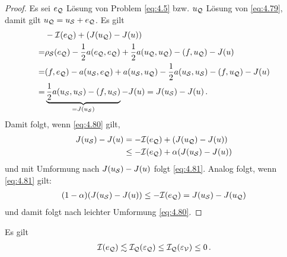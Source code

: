 \begin{proof}
Es sei $e_{\mathcal Q}$ Lösung von Problem \eqref{eq:4.5} bzw. $u_{\mathcal Q}$ Lösung von \eqref{eq:4.79}, damit gilt $u_{\mathcal Q} = u_{\mathcal S} + e_{\mathcal Q}$. Es gilt
\begin{align*}
	& -\mathcal I(e_{\mathcal Q}) + (J(u_{\mathcal Q})-J(u))  \\
	 = & \rho_{\mathcal S}(e_{\mathcal Q})-\frac 12 a(e_{\mathcal Q},e_{\mathcal Q}) + \frac 12 a(u_{\mathcal Q},u_{\mathcal Q})-(f,u_{\mathcal Q})-J(u) \\
	 = & (f,e_{\mathcal Q})-a(u_{\mathcal S},e_{\mathcal Q})+a(u_{\mathcal S},u_{\mathcal Q})-\frac 12 a(u_{\mathcal S},u_{\mathcal S})-(f,u_{\mathcal Q})- J(u) \\
	 = & \underbrace{\frac 1 2 a(u_{\mathcal S},u_{\mathcal S}) - (f,u_{\mathcal S})}_{=J(u_{\mathcal S})} - J(u) = J(u_{\mathcal S})-J(u) \, .
\end{align*}
Damit folgt, wenn \eqref{eq:4.80} gilt,
\begin{align*}
	J(u_{\mathcal S})-J(u) &= -\mathcal I (e_{\mathcal Q}) + (J(u_{\mathcal Q})-J(u)) \\
	& \le -\mathcal I(e_{\mathcal Q}) + \alpha (J(u_{\mathcal S})-J(u))
\end{align*}
und mit Umformung nach $J(u_{\mathcal S})-J(u)$ folgt \eqref{eq:4.81}. Analog folgt, wenn \eqref{eq:4.81} gilt:
\begin{align*}
	(1-\alpha)(J(u_{\mathcal S}) - J(u)) \le -\mathcal I (e_{\mathcal Q}) = J(u_{\mathcal S})-J(u_{\mathcal Q}) 
\end{align*}
und damit folgt nach leichter Umformung \eqref{eq:4.80}.
\end{proof}


\begin{lemma}\label{lem:4.27}
Es gilt
\begin{align}\label{eq:4.82}
	\mathcal I(e_{\mathcal Q}) \lesssim \mathcal I_{\mathcal Q} (\varepsilon_{\mathcal Q}) \le \mathcal I_{\mathcal Q} (\varepsilon_{\mathcal V}) \le 0 \, .
\end{align}
\end{lemma}

